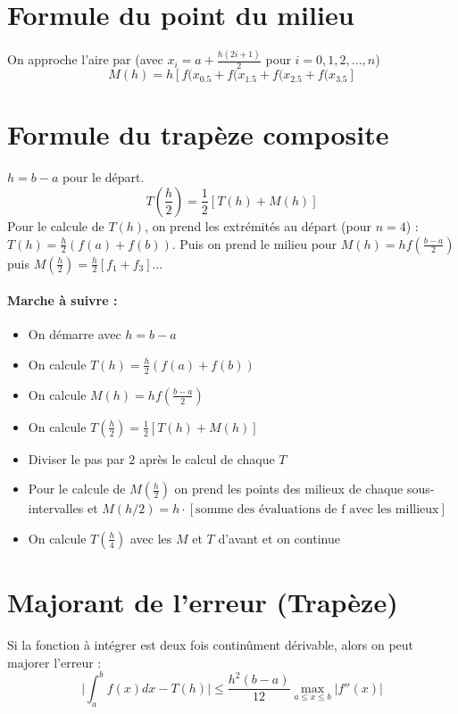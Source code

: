 \documentclass[a4paper,9pt]{extarticle}
\begin{document}
\begin{multicols*}{2}
\section{Formule du point du milieu}

On approche l'aire par (avec $x_i=a+\frac{h(2i+1)}{2}$ pour $i=0,1,2,...,n$)
$$
M(h)=h[f(x_{0.5}+f(x_{1.5}+f(x_{2.5}+f(x_{3.5}]
$$

\section{Formule du trapèze composite}
$h=b-a$ pour le départ.
$$
T(\frac{h}{2})=\frac{1}{2}[T(h)+M(h)]
$$
Pour le calcule de $T(h)$, on prend les extrémités au départ (pour $n=4$) : $T(h)=\frac{h}{2}(f(a)+f(b))$. Puis on prend le milieu pour $M(h)=hf(\frac{b-a}{2})$ puis $M(\frac{h}{2})=\frac{h}{2}[f_1+f_3]$...

\paragraph*{Marche à suivre :}
\begin{itemize}
    \item On démarre avec $h=b-a$
    \item On calcule $T(h)=\frac{h}{2}(f(a)+f(b))$
    \item On calcule $M(h)=hf(\frac{b-a}{2})$
    \item On calcule $T(\frac{h}{2})=\frac{1}{2}[T(h)+M(h)]$
    \item Diviser le pas par $2$ après le calcul de chaque $T$
    \item Pour le calcule de $M(\frac{h}{2})$ on prend les points des milieux de chaque sous-intervalles et $M(h/2)=h\cdot[\text{somme des évaluations de f avec les millieux}]$
    \item On calcule $T(\frac{h}{4})$ avec les $M$ et $T$ d'avant et on continue
\end{itemize}

\section{Majorant de l'erreur (Trapèze)}
Si la fonction à intégrer est deux fois continûment dérivable, alors on peut majorer l'erreur :
$$
\Big|\int_a^bf(x)dx-T(h)\Big|\leq \frac{h^2(b-a)}{12} \max_{a\leq x \leq b}|f''(x)|
$$


\end{multicols*}
\end{document}
